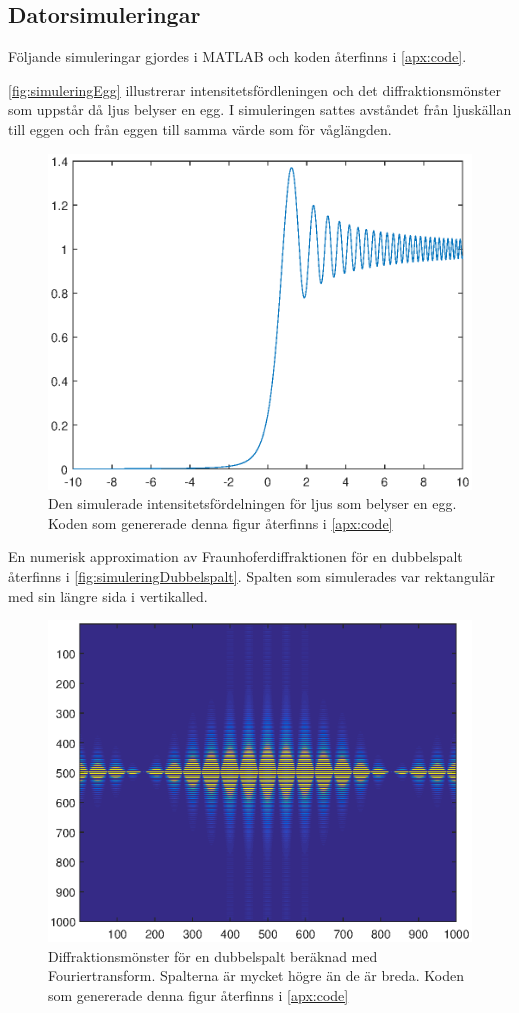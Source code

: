 \documentclass[a4paper]{article}
\begin{document}
\FloatBarrier

\subsection{Datorsimuleringar}

Följande simuleringar gjordes i \textsc{MATLAB} och koden återfinns i \autoref{apx:code}.

\autoref{fig:simuleringEgg} illustrerar intensitetsfördleningen och det diffraktionsmönster som uppstår då ljus belyser en egg. I simuleringen sattes avståndet från ljuskällan till eggen och från eggen till samma värde som för våglängden.

\FloatBarrier

\begin{figure}[h!]
	\centering
	\includegraphics[width=0.5\linewidth]{Data/Figurer/simuleringEgg.eps}
	\caption{Den simulerade intensitetsfördelningen för ljus som belyser en egg. Koden som genererade denna figur återfinns i \autoref{apx:code}}
	\label{fig:simuleringEgg}
\end{figure}

\FloatBarrier

En numerisk approximation av Fraunhoferdiffraktionen för en dubbelspalt återfinns i \autoref{fig:simuleringDubbelspalt}. Spalten som simulerades var rektangulär med sin längre sida i vertikalled. 

\FloatBarrier

\begin{figure}[h!]
	\centering
	\includegraphics[width=0.5\linewidth]{Data/Figurer/simuleringDubbelspalt.eps}
	\caption{Diffraktionsmönster för en dubbelspalt beräknad med Fouriertransform. Spalterna är mycket högre än de är breda. Koden som genererade denna figur återfinns i \autoref{apx:code}}
	\label{fig:simuleringDubbelspalt}
\end{figure}
\end{document}
